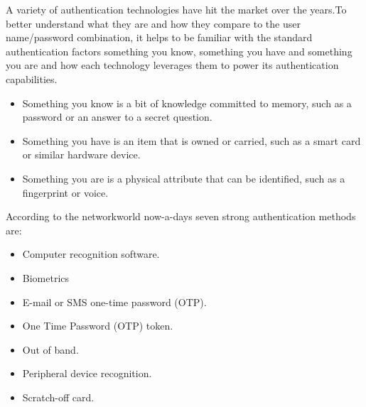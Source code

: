  A variety of authentication technologies have hit the market over the years.To better understand what they are and how they compare to the user name/password combination, it helps to be familiar with the standard authentication factors something you know, something you have and something you are and how each technology leverages them to power its authentication capabilities.
 \begin{itemize}	
	\item Something you know is a bit of knowledge committed to memory, such as a password or
	 an answer to a secret question.
	\item Something you have is an item that is owned or carried, such as a smart card or similar
	 hardware device.
	\item	 Something you are is a physical attribute that can be identified, such as a fingerprint or voice.
\end{itemize}

According to the networkworld \cite{ref_21_networld} now-a-days seven strong authentication methods are:
\begin{itemize}
\item Computer recognition software.
\item Biometrics
\item E-mail or SMS one-time password (OTP).
\item One Time Password (OTP) token.
\item Out of band.
\item Peripheral device recognition.
\item Scratch-off card.
\end{itemize}	


